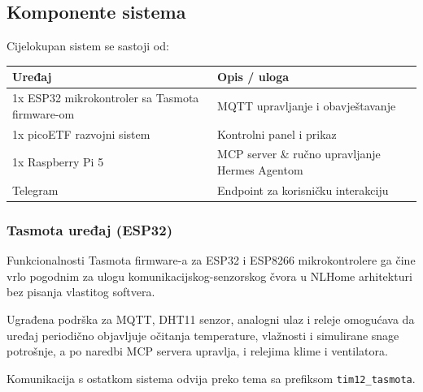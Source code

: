 \documentclass[11pt,a4paper]{article}
\begin{document}
\subsection{Komponente sistema}

Cijelokupan sistem se sastoji od:
\begin{table}[ht]
      \centering
      \begin{tabular}{@{}lp{7cm}@{}}
            \toprule
            \textbf{Uređaj}                                & \textbf{Opis / uloga}                          \\
            \midrule
            1x ESP32 mikrokontroler sa Tasmota firmware-om & MQTT upravljanje i obavještavanje              \\
            1x picoETF razvojni sistem                     & Kontrolni panel i prikaz                       \\
            1x Raspberry Pi 5                              & MCP server \& ručno upravljanje Hermes Agentom \\
            Telegram                                       & Endpoint za korisničku interakciju             \\

            \bottomrule
      \end{tabular}
\end{table}

\subsubsection{Tasmota uređaj (ESP32)}

Funkcionalnosti Tasmota firmware-a za ESP32 i ESP8266 mikrokontrolere ga čine vrlo pogodnim za
ulogu komunikacijskog-senzorskog čvora u NLHome arhitekturi bez pisanja vlastitog softvera.

Ugrađena podrška za MQTT, DHT11 senzor,
analogni ulaz i releje omogućava da uređaj periodično objavljuje očitanja temperature, vlažnosti
i simulirane snage potrošnje, a po naredbi MCP servera upravlja, i relejima klime i ventilatora.

Komunikacija s ostatkom sistema odvija preko tema sa prefiksom \texttt{tim12\_tasmota}.
\end{document}
